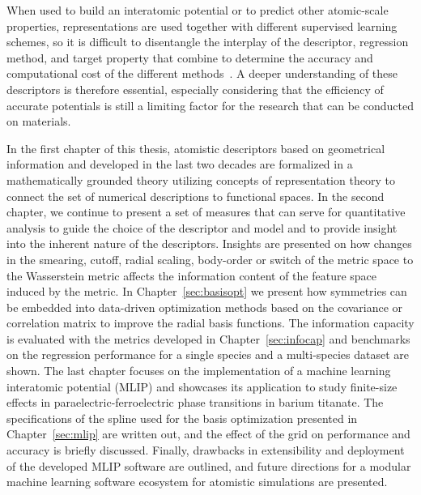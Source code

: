 When used to build an interatomic potential or to predict other atomic-scale properties, representations are used together with different supervised learning schemes, so it is difficult to disentangle the interplay of the descriptor, regression method, and target property that combine to determine the accuracy and computational cost of the different methods~\cite{zuo+20jpcl}.
A deeper understanding of these descriptors is therefore essential, especially considering that the efficiency of accurate potentials is still a limiting factor for the research that can be conducted on materials.

In the first chapter of this thesis, atomistic descriptors based on geometrical information and developed in the last two decades are formalized in a mathematically grounded theory utilizing concepts of representation theory to connect the set of numerical descriptions to functional spaces. %
In the second chapter, we continue to present a set of measures that can serve for quantitative analysis to guide the choice of the descriptor and model and to provide insight into the inherent nature of the descriptors.
Insights are presented on how changes in the smearing, cutoff, radial scaling, body-order or switch of the metric space to the Wasserstein metric affects the information content of the feature space induced by the metric.
In Chapter~\ref{sec:basisopt} we present how symmetries can be embedded into data-driven optimization methods based on the covariance or correlation matrix to improve the radial basis functions.
The information capacity is evaluated with the metrics developed in Chapter~\ref{sec:infocap} and benchmarks on the regression performance for a single species and a multi-species dataset are shown.
The last chapter focuses on the implementation of a machine learning interatomic potential (MLIP) and showcases its application to study finite-size effects in paraelectric-ferroelectric phase transitions in barium titanate.
The specifications of the spline used for the basis optimization presented in Chapter~\ref{sec:mlip} are written out, and the effect of the grid on performance and accuracy is briefly discussed.
Finally, drawbacks in extensibility and deployment of the developed MLIP software are outlined, and future directions for a modular machine learning software ecosystem for atomistic simulations are presented.

